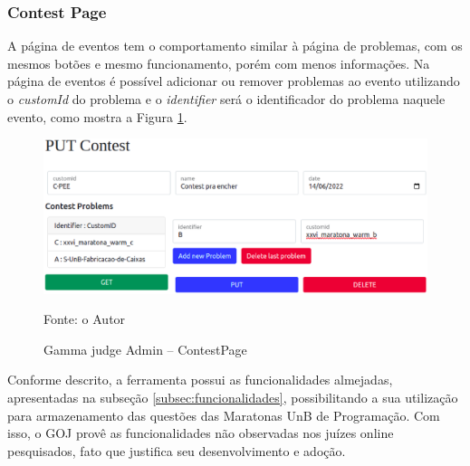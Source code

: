 \subsubsection{Contest Page}

A página de eventos tem o comportamento similar à página de problemas, com os mesmos botões e mesmo funcionamento, porém com menos informações. Na página de eventos é possível adicionar ou remover problemas ao evento utilizando o \textit{customId} do problema e o \textit{identifier} será o identificador do problema naquele evento, como mostra a Figura \ref{fig:judge_admin_contest}.

\begin{figure}
    \centering
    \caption{Gamma judge Admin -- ContestPage}
    \includegraphics[keepaspectratio=true,scale=0.45]{figuras/contest_page.eps}
    \label{fig:judge_admin_contest}
    
    \medskip
    Fonte: o Autor
    \medskip
\end{figure}
Conforme descrito, a ferramenta possui as funcionalidades almejadas, apresentadas na subseção \ref{subsec:funcionalidades}, possibilitando a sua utilização para armazenamento das questões das Maratonas UnB de Programação. Com isso, o GOJ provê as funcionalidades não observadas nos juízes online pesquisados, fato que justifica seu desenvolvimento e adoção.
